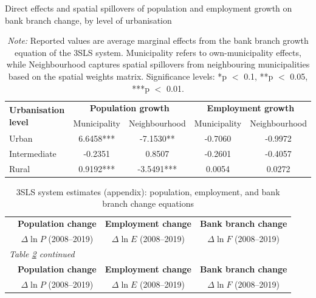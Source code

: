 \documentclass[a4paper,11pt,oneside]{article}
\begin{document}
{\begin{table}
\centering
\caption{Direct effects and spatial spillovers of population and employment growth on bank branch change, by level of urbanisation}
\label{tab:branches_spillovers}
\vspace{-2mm}

\begin{tabular}{lcccc}
\toprule
\multirow{2}{*}{\textbf{Urbanisation level}}
& \multicolumn{2}{c}{\textbf{Population growth}}
& \multicolumn{2}{c}{\textbf{Employment growth}} \\
\cmidrule(lr){2-3} \cmidrule(lr){4-5}
& Municipality & Neighbourhood
& Municipality & Neighbourhood \\
\midrule
Urban
& 6.6458***  & -7.1530**
& -0.7060    & -0.9972 \\
Intermediate
& -0.2351    & 0.8507
& -0.2601    & -0.4057 \\
Rural
& 0.9192***  & -3.5491***
& 0.0054     & 0.0272 \\
\bottomrule
\end{tabular}

\vspace{0.2cm}
\caption*{\footnotesize
\textsl{Note:} Reported values are average marginal effects from the bank branch growth equation of the 3SLS system.
Municipality refers to own-municipality effects, while Neighbourhood captures spatial spillovers from neighbouring municipalities based on the spatial weights matrix.
Significance levels: *p $<$ 0.1, **p $<$ 0.05, ***p $<$ 0.01.}
\end{table}

\pagebreak
\clearpage





\footnotesize
\begin{longtable}{lccc}
\caption{3SLS system estimates (appendix): population, employment, and bank branch change equations}
\label{tbl:3sls_full_readabl}\\

\toprule
 & \textbf{Population change} & \textbf{Employment change} & \textbf{Bank branch change} \\
 & $\Delta \ln P$ (2008--2019) & $\Delta \ln E$ (2008--2019) & $\Delta \ln F$ (2008--2019) \\
\midrule
\endfirsthead

\multicolumn{4}{l}{\small\textit{Table \ref{tbl:3sls_full_readabl} continued}}\\
\toprule
 & \textbf{Population change} & \textbf{Employment change} & \textbf{Bank branch change} \\
 & $\Delta \ln P$ (2008--2019) & $\Delta \ln E$ (2008--2019) & $\Delta \ln F$ (2008--2019) \\
\midrule
\endhead


\end{longtable}}
\end{document}

